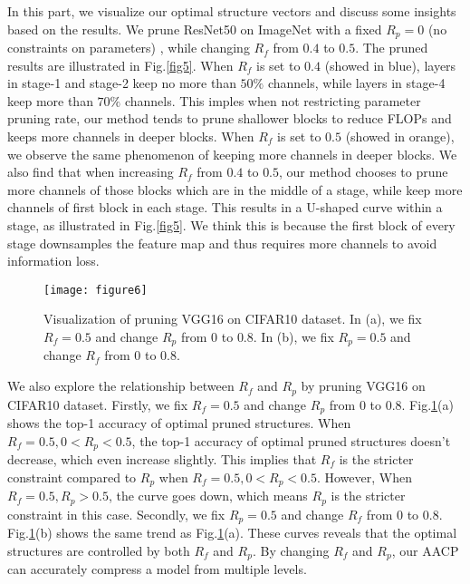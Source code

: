 \documentclass[final]{cvpr}
\begin{document}
In this part, we visualize our optimal structure vectors and discuss some insights based on the results.
We prune ResNet50 on ImageNet with a fixed $R_p = 0$ (no constraints on parameters)
, while changing $R_f$ from $0.4$ to $0.5$. The pruned results are illustrated
in Fig.\ref{fig5}. When $R_f$ is set to $0.4$ (showed in blue), layers in stage-1 and stage-2 keep no more than $50\%$
channels, while layers in stage-4 keep more than $70\%$ channels. This imples when not restricting parameter pruning rate, 
our method tends to prune shallower blocks to reduce FLOPs and keeps more channels in deeper blocks.
When $R_f$ is set to $0.5$ (showed in orange), we observe the same phenomenon of keeping more channels in deeper blocks. We also find that 
when increasing $R_f$ from $0.4$ to $0.5$, our method chooses to prune more channels of those
blocks which are in the middle of a stage, while keep more channels of first block in each stage. This results in a U-shaped curve within a stage, 
as illustrated in Fig.\ref{fig5}. We think this is because the first block of every stage downsamples the feature map and thus requires 
more channels to avoid information loss.

\begin{figure}[t]
    \centering
    \texttt{[image: figure6]} %
    \caption{
        Visualization of pruning VGG16 on CIFAR10 dataset. In (a), we fix $R_f=0.5$ and change $R_p$ from $0$ to $0.8$. 
        In (b), we fix $R_p=0.5$ and change $R_f$ from $0$ to $0.8$.
    }
    \label{fig6}
\end{figure}

We also explore the relationship between $R_f$ and $R_p$ by pruning VGG16 on CIFAR10 dataset. Firstly, we fix $R_f=0.5$
and change $R_p$ from $0$ to $0.8$. Fig.\ref{fig6}(a) shows the top-1 accuracy of optimal pruned structures.
When $R_f=0.5, 0 < R_p < 0.5$, the top-1 accuracy of optimal pruned structures doesn’t decrease, which even increase slightly. This implies
that $R_f$ is the stricter constraint compared to $R_p$ when $R_f=0.5, 0 < R_p < 0.5$. However, When $R_f=0.5, R_p > 0.5$, the 
curve goes down, which means $R_p$ is the stricter constraint in this case. Secondly, we fix $R_p=0.5$ and change $R_f$ from 
$0$ to $0.8$. Fig.\ref{fig6}(b) shows the same trend as Fig.\ref{fig6}(a). These curves reveals that the optimal structures are controlled 
by both $R_f$ and $R_p$. By changing $R_f$ and $R_p$, our AACP can accurately compress a model from multiple levels.
\end{document}
